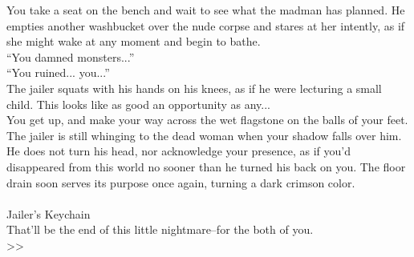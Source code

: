 You take a seat on the bench and wait to see what the madman has planned. He empties another washbucket over the nude corpse and stares at her intently, as if she might wake at any moment and begin to bathe.\\

“You damned monsters...”\\

“You ruined... you...”\\

The jailer squats with his hands on his knees, as if he were lecturing a small child. This looks like as good an opportunity as any...\\

You get up, and make your way across the wet flagstone on the balls of your feet. The jailer is still whinging to the dead woman when your shadow falls over him. He does not turn his head, nor acknowledge your presence, as if you’d disappeared from this world no sooner than he turned his back on you. The floor drain soon serves its purpose once again, turning a dark crimson color.\\
\\
 Jailer’s Keychain\\

That’ll be the end of this little nightmare--for the both of you.\\
>>